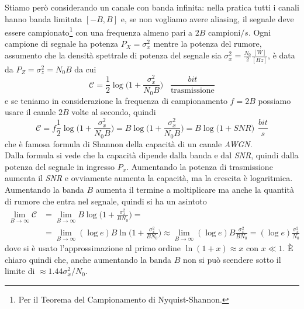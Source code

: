 Stiamo per\`o considerando un canale con banda infinita: nella pratica tutti i canali hanno banda limitata $[-B,B]$ e, se non vogliamo avere aliasing, il segnale deve essere campionato\footnote{Per il Teorema del Campionamento di Nyquist-Shannon.} con una frequenza almeno pari a $2B$ campioni$/s$. Ogni campione di segnale ha potenza $P_X = \sigma_x^2$ mentre la potenza del rumore, assumento che la densità spettrale di potenza del segnale sia $\sigma_x^2 = \frac{N_0}{2} \frac{[W]}{[Hz]}$, \`e data da $P_Z = \sigma_z^2 = N_0 B$ da cui
\begin{equation*}
    \mathcal{C} = \frac{1}{2} \log \bigg ( 1 + \frac{\sigma_x^2}{N_0 B} \bigg ) \hspace{10pt} \frac{bit}{\text{trasmissione}}
\end{equation*}
e se teniamo in considerazione la frequenza di campionamento $f = 2B$ possiamo usare il canale $2B$ volte al secondo, quindi
\begin{equation}
    \mathcal{C} = f \frac{1}{2} \log \bigg ( 1 + \frac{\sigma_x^2}{N_0 B} \bigg ) = B \log \bigg ( 1 + \frac{\sigma_x^2}{N_0 B} \bigg ) = B \log \big (1 + SNR \big ) \hspace{5pt} \frac{bit}{s}
\end{equation}
che è famosa formula di Shannon della capacità di un canale \textit{AWGN}. \\
Dalla formula si vede che la capacità dipende dalla banda e dal \textit{SNR}, quindi dalla potenza del segnale in ingresso $P_x$. Aumentando la potenza di trasmissione aumenta il \textit{SNR} e ovviamente aumenta la capacità, ma la crescita è logaritmica. Aumentando la banda $B$ aumenta il termine a moltiplicare ma anche la quantità di rumore che entra nel segnale, quindi si ha un asintoto
\begin{align*}
    \lim_{B \to \infty} \mathcal{C} &= \lim_{B \to \infty} B \log \bigg ( 1 + \frac{\sigma_x^2}{BN_0} \bigg ) = \\
    &=\lim_{B \to \infty} (\log e) B \ln \bigg ( 1 + \frac{\sigma_x^2}{BN_0} \bigg ) \approx \lim_{B \to \infty} (\log e) B \frac{\sigma_x^2}{BN_0} = (\log e) \frac{\sigma_x^2}{N_0}
\end{align*}
dove si \`e usato l’approssimazione al primo ordine $\ln (1 + x) \approx x$ con $x \ll 1$. \`E chiaro quindi che, anche aumentando la banda $B$ non si pu\`o scendere sotto il limite di $\approx 1.44 \sigma_x^2/N_0$.

